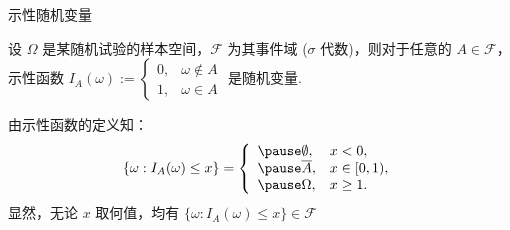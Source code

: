 \begin{frame}{示性随机变量}
	\begin{exam}
		设 $\Omega$ 是某随机试验的样本空间，$\mathcal{F}$ 为其事件域 ($\sigma$ 代数)，则对于任意的 $A\in \mathcal{F}$， 示性函数
		$I_A(\omega):=\left\{
			\begin{array}{ll}
				0, & \omega\notin A \\
				1, & \omega\in A
			\end{array}\right.$ 是随机变量.
	\end{exam}

	\pause
	\jieda  由示性函数的定义知：
	\begin{eqnarray*}
		\{\omega:I_A(\omega)\le x\}=\left\{
		\begin{array}{ll}
			\pause \emptyset, & x<0,        \\ \pause
			\overline{A},     & x\in [0,1), \\\pause
			\Omega,           & x\ge 1.
		\end{array}
		\right.
	\end{eqnarray*}
	\pause
	显然，无论 $x$ 取何值，均有 $\{\omega:I_A (\omega)\le x\}\in \mathcal{F}$


\end{frame}






